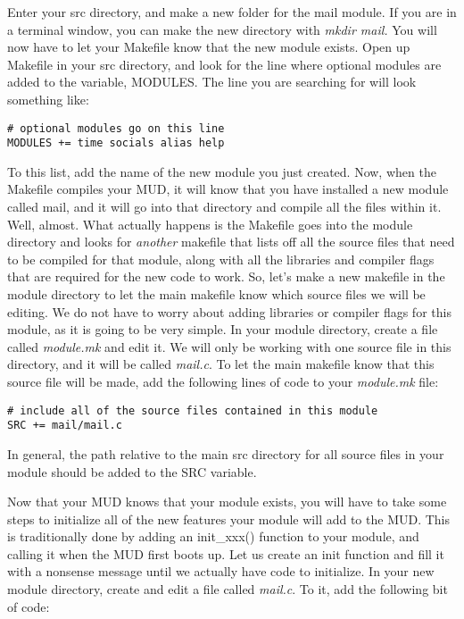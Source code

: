 \documentclass[12pt]{article}
\begin{document}
Enter your src directory, and make a new folder for the mail module. If you are in a terminal window, you can make the new directory with {\it mkdir mail.} You will now have to let your Makefile know that the new module exists. Open up Makefile in your src directory, and look for the line where optional modules are added to the variable, MODULES. The line you are searching for will look something like:

{\bf \begin{verbatim}
# optional modules go on this line
MODULES += time socials alias help
\end{verbatim}}

To this list, add the name of the new module you just created. Now, when the Makefile compiles your MUD, it will know that you have installed a new module called mail, and it will go into that directory and compile all the files within it. Well, almost. What actually happens is the Makefile goes into the module directory and looks for {\it another} makefile that lists off all the source files that need to be compiled for that module, along with all the libraries and compiler flags that are required for the new code to work. So, let's make a new makefile in the module directory to let the main makefile know which source files we will be editing. We do not have to worry about adding libraries or compiler flags for this module, as it is going to be very simple. In your module directory, create a file called {\it module.mk} and edit it. We will only be working with one source file in this directory, and it will be called {\it mail.c}. To let the main makefile know that this source file will be made, add the following lines of code to your {\it module.mk} file:

{\bf \begin{verbatim}
# include all of the source files contained in this module
SRC += mail/mail.c
\end{verbatim}}

In general, the path relative to the main src directory for all source files in your module should be added to the SRC variable.

Now that your MUD knows that your module exists, you will have to take some steps to initialize all of the new features your module will add to the MUD. This is traditionally done by adding an init\_xxx() function to your module, and calling it when the MUD first boots up. Let us create an init function and fill it with a nonsense message until we actually have code to initialize. In your new module directory, create and edit a file called {\it mail.c}. To it, add the following bit of code:
\end{document}
